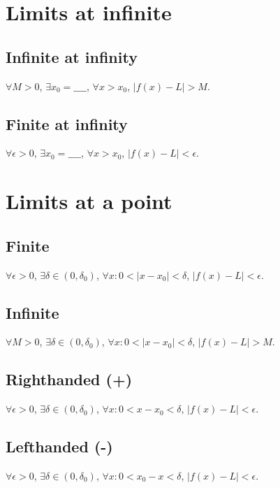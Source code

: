 \documentclass[12pt]{article}
\newcommand{\abs}  [1]{\left|       #1 \right|      }
\begin{document}
\begin{multicols}{2}

\section*{Limits at infinite}

\subsection*{Infinite at infinity}
$\forall M > 0$, $\exists x_0 = \_\_\_\_$, $\forall x > x_0$, $\abs{f(x) - L} > M$.

\subsection*{Finite at infinity}
$\forall \epsilon > 0$, $\exists x_0 = \_\_\_\_$, $\forall x > x_0$, $\abs{f(x) - L} < \epsilon$.



\section*{Limits at a point}

\subsection*{Finite}
$\forall \epsilon > 0$, $\exists \delta \in (0, \delta_0)$, $\forall x : 0 < \abs{x-x_0} < \delta$, $\abs{f(x) - L} < \epsilon$.

\subsection*{Infinite}
$\forall M > 0$, $\exists \delta \in (0, \delta_0)$, $\forall x : 0 < \abs{x-x_0} < \delta$, $\abs{f(x) - L} > M$.

\subsection*{Righthanded (+)}
$\forall \epsilon > 0$, $\exists \delta \in (0, \delta_0)$, $\forall x : 0 < x-x_0 < \delta$, $\abs{f(x) - L} < \epsilon$.

\subsection*{Lefthanded (-)}
$\forall \epsilon > 0$, $\exists \delta \in (0, \delta_0)$, $\forall x : 0 < x_0-x < \delta$, $\abs{f(x) - L} < \epsilon$.



\end{multicols}
\end{document}
